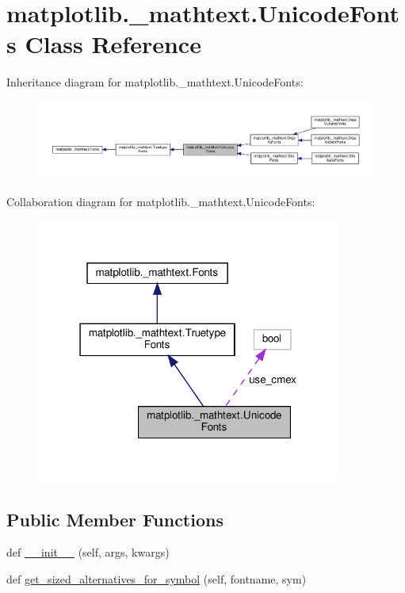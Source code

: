 \hypertarget{classmatplotlib_1_1__mathtext_1_1UnicodeFonts}{}\section{matplotlib.\+\_\+mathtext.\+Unicode\+Fonts Class Reference}
\label{classmatplotlib_1_1__mathtext_1_1UnicodeFonts}


Inheritance diagram for matplotlib.\+\_\+mathtext.\+Unicode\+Fonts\+:
\nopagebreak
\begin{figure}[H]
\begin{center}
\leavevmode
\includegraphics[width=350pt]{classmatplotlib_1_1__mathtext_1_1UnicodeFonts__inherit__graph}
\end{center}
\end{figure}


Collaboration diagram for matplotlib.\+\_\+mathtext.\+Unicode\+Fonts\+:
\nopagebreak
\begin{figure}[H]
\begin{center}
\leavevmode
\includegraphics[width=286pt]{classmatplotlib_1_1__mathtext_1_1UnicodeFonts__coll__graph}
\end{center}
\end{figure}
\subsection*{Public Member Functions}
\begin{DoxyCompactItemize}
\item 
def \hyperlink{classmatplotlib_1_1__mathtext_1_1UnicodeFonts_a2e6524b6d5ec5911363ad95cddda4995}{\+\_\+\+\_\+init\+\_\+\+\_\+} (self, args, kwargs)
\item 
def \hyperlink{classmatplotlib_1_1__mathtext_1_1UnicodeFonts_ac685f9b43d6d7afde80d577e128c78c1}{get\+\_\+sized\+\_\+alternatives\+\_\+for\+\_\+symbol} (self, fontname, sym)
\end{DoxyCompactItemize}
